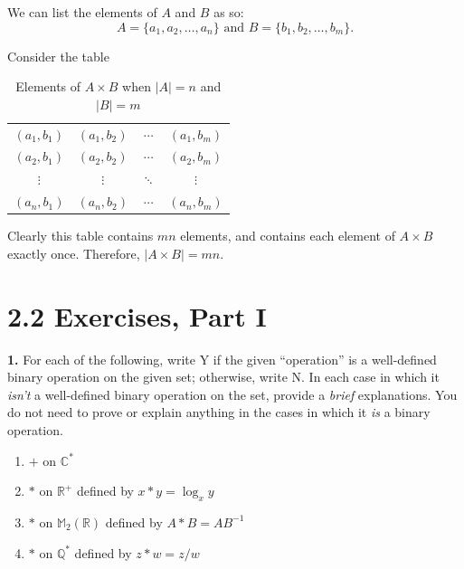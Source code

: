 \documentclass[10pt,]{book}
\theoremstyle{plain}
\theoremstyle{definition}
\theoremstyle{definition}
\theoremstyle{definition}
\theoremstyle{definition}
\numberwithin{equation}{section}
\def\R{\mathbb{R}}
\def\Q{\mathbb{Q}}
\def\C{\mathbb{C}}
\def\M{\mathbb{M}}
\begin{document}
      We can list the elements of \(A\) and \(B\) as so:
\begin{equation*}

        A=\{a_1,a_2,\ldots, a_n\} \mbox{ and } B=\{b_1,b_2,\ldots, b_m\}.
      
\end{equation*}

\par

      Consider the table
\leavevmode%
\begin{table}
\centering
\begin{tabular}{cccc}
\((a_1,b_1)\)&\((a_1,b_2)\)&\(\cdots\)&\((a_1,b_m)\)\tabularnewline[0pt]
\((a_2,b_1)\)&\((a_2,b_2)\)&\(\cdots\)&\((a_2,b_m)\)\tabularnewline[0pt]
\(\vdots\)&\(\vdots\)&\(\ddots\)&\(\vdots\)\tabularnewline[0pt]
\((a_n,b_1)\)&\((a_n,b_2)\)&\(\cdots\)&\((a_n,b_m)\)
\end{tabular}
\caption{Elements of \(A\times B\) when \(|A|=n\) and \(|B|=m\)\label{cardmn}}
\end{table}
\par

      Clearly this table contains \(mn\) elements, and contains each element of \(A\times B\) exactly once. Therefore, \(|A\times B|=mn\).
\par\smallskip
\section*{2.2 Exercises, Part I}
\noindent\textbf{1.}\quad{}
        For each of the following, write Y if the given ``operation'' is a well-defined binary operation on the given set; otherwise, write N. In each case in which it \emph{isn't} a well-defined binary operation on the set, provide a \emph{brief} explanations. You do not need to prove or explain anything in the cases in which it \emph{is} a binary operation.
        \leavevmode%
\begin{enumerate}[label=(\alph*)]
\item\hypertarget{li-58}{}
              \(+\) on \(\C^*\)
\item\hypertarget{li-59}{}
              \(*\) on \(\R^+\) defined by \(x*y=\log_x y\)
\item\hypertarget{li-60}{}
              \(*\) on \(\M_2(\R)\) defined by \(A*B=AB^{-1}\)
\item\hypertarget{li-61}{}
              \(*\) on \(\Q^*\) defined by \(z*w=z/w\)
\end{enumerate}
\end{document}
